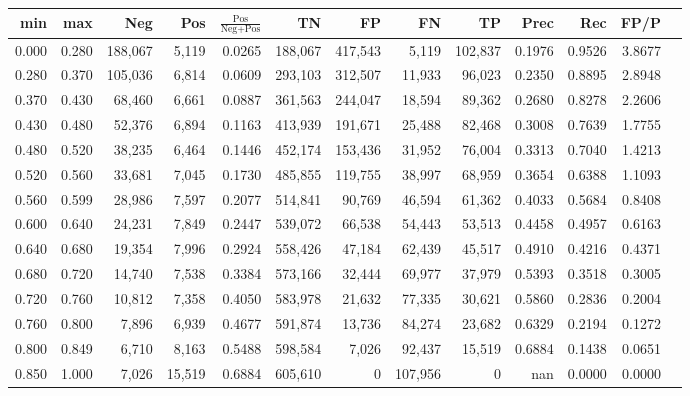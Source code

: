 \begin{tabular}{rrrrrrrrrrrrr}
\toprule
  min &   max &     Neg &    Pos & $\frac{\text{Pos}}{\text{Neg}+\text{Pos}}$ &      TN &      FP &      FN &      TP &   Prec &    Rec &   FP/P \\
\midrule
0.000 & 0.280 & 188,067 &  5,119 &                                     0.0265 & 188,067 & 417,543 &   5,119 & 102,837 & 0.1976 & 0.9526 & 3.8677 \\
0.280 & 0.370 & 105,036 &  6,814 &                                     0.0609 & 293,103 & 312,507 &  11,933 &  96,023 & 0.2350 & 0.8895 & 2.8948 \\
0.370 & 0.430 &  68,460 &  6,661 &                                     0.0887 & 361,563 & 244,047 &  18,594 &  89,362 & 0.2680 & 0.8278 & 2.2606 \\
0.430 & 0.480 &  52,376 &  6,894 &                                     0.1163 & 413,939 & 191,671 &  25,488 &  82,468 & 0.3008 & 0.7639 & 1.7755 \\
0.480 & 0.520 &  38,235 &  6,464 &                                     0.1446 & 452,174 & 153,436 &  31,952 &  76,004 & 0.3313 & 0.7040 & 1.4213 \\
0.520 & 0.560 &  33,681 &  7,045 &                                     0.1730 & 485,855 & 119,755 &  38,997 &  68,959 & 0.3654 & 0.6388 & 1.1093 \\
0.560 & 0.599 &  28,986 &  7,597 &                                     0.2077 & 514,841 &  90,769 &  46,594 &  61,362 & 0.4033 & 0.5684 & 0.8408 \\
0.600 & 0.640 &  24,231 &  7,849 &                                     0.2447 & 539,072 &  66,538 &  54,443 &  53,513 & 0.4458 & 0.4957 & 0.6163 \\
0.640 & 0.680 &  19,354 &  7,996 &                                     0.2924 & 558,426 &  47,184 &  62,439 &  45,517 & 0.4910 & 0.4216 & 0.4371 \\
0.680 & 0.720 &  14,740 &  7,538 &                                     0.3384 & 573,166 &  32,444 &  69,977 &  37,979 & 0.5393 & 0.3518 & 0.3005 \\
0.720 & 0.760 &  10,812 &  7,358 &                                     0.4050 & 583,978 &  21,632 &  77,335 &  30,621 & 0.5860 & 0.2836 & 0.2004 \\
0.760 & 0.800 &   7,896 &  6,939 &                                     0.4677 & 591,874 &  13,736 &  84,274 &  23,682 & 0.6329 & 0.2194 & 0.1272 \\
0.800 & 0.849 &   6,710 &  8,163 &                                     0.5488 & 598,584 &   7,026 &  92,437 &  15,519 & 0.6884 & 0.1438 & 0.0651 \\
0.850 & 1.000 &   7,026 & 15,519 &                                     0.6884 & 605,610 &       0 & 107,956 &       0 &    nan & 0.0000 & 0.0000 \\
\bottomrule
\end{tabular}

